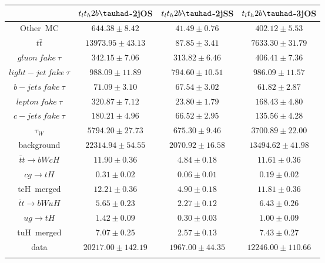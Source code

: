 \centering
\begin{tabular}{cccc} \toprule\toprule
 & $t_{l}t_{h}2b\tauhad$-2jOS & $t_{l}t_{h}2b\tauhad$-2jSS & $t_{l}t_{h}2b\tauhad$-3jOS \\\midrule
\hspace{9mm}Other~MC & $644.38\pm8.42$ & $41.49\pm0.76$ & $402.12\pm5.53$ \\
\hspace{9mm}$t\bar{t}$ & $13973.95\pm43.13$ & $87.85\pm3.41$ & $7633.30\pm31.79$\\
\hspace{9mm}$gluon~fake~\tau$ & $342.15\pm7.06$ & $313.82\pm6.46$ & $406.41\pm7.36$\\
\hspace{9mm}$light-jet~fake~\tau$ & $988.09\pm11.89$ & $794.60\pm10.51$ & $986.09\pm11.57$\\
\hspace{9mm}$b-jets~fake~\tau$ & $71.09\pm3.10$ & $67.54\pm3.02$ & $61.82\pm2.87$\\
\hspace{9mm}$lepton~fake~\tau$ & $320.87\pm7.12$ & $23.80\pm1.79$ & $168.43\pm4.80$\\
\hspace{9mm}$c-jets~fake~\tau$ & $180.21\pm4.96$ & $66.52\pm2.95$ & $135.56\pm4.28$\\
\hspace{9mm}$\tau_{W}$ & $5794.20\pm27.73$ & $675.30\pm9.46$ & $3700.89\pm22.00$\\
background & $22314.94\pm54.55$ & $2070.92\pm16.58$ & $13494.62\pm41.98$\\\midrule
\hspace{9mm}$\bar{t}t\to bWcH$ & $11.90\pm0.36$ & $4.84\pm0.18$ & $11.61\pm0.36$\\
\hspace{9mm}$cg\to tH$ & $0.31\pm0.02$ & $0.06\pm0.01$ & $0.19\pm0.02$\\
tcH~merged & $12.21\pm0.36$ & $4.90\pm0.18$ & $11.81\pm0.36$\\
\hspace{9mm}$\bar{t}t\to bWuH$ & $5.65\pm0.23$ & $2.27\pm0.12$ & $6.43\pm0.26$\\
\hspace{9mm}$ug\to tH$ & $1.42\pm0.09$ & $0.30\pm0.03$ & $1.00\pm0.09$\\
tuH~merged & $7.07\pm0.25$ & $2.57\pm0.13$ & $7.43\pm0.27$\\\midrule
data & $20217.00\pm142.19$ & $1967.00\pm44.35$ & $12246.00\pm110.66$\\
\bottomrule\bottomrule\\
\end{tabular}

